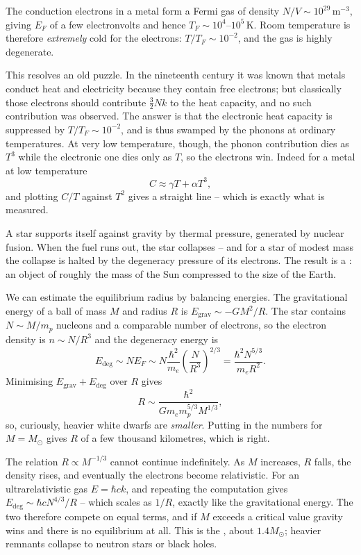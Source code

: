 \begin{example}
	The conduction electrons in a metal form a Fermi gas of density $N/V \sim 10^{29}\,\mathrm{m}^{-3}$, giving $E_F$ of a few electronvolts and hence $T_F \sim 10^4$--$10^5\,\mathrm{K}$. Room temperature is therefore \emph{extremely} cold for the electrons: $T/T_F \sim 10^{-2}$, and the gas is highly degenerate.

	This resolves an old puzzle. In the nineteenth century it was known that metals conduct heat and electricity because they contain free electrons; but classically those electrons should contribute $\tfrac 32 Nk$ to the heat capacity, and no such contribution was observed. The answer is that the electronic heat capacity is suppressed by $T/T_F \sim 10^{-2}$, and is thus swamped by the phonons at ordinary temperatures. At very low temperature, though, the phonon contribution dies as $T^3$ while the electronic one dies only as $T$, so the electrons win. Indeed for a metal at low temperature
	$$
	C \approx \gamma T + \alpha T^3,
	$$
	and plotting $C/T$ against $T^2$ gives a straight line -- which is exactly what is measured.
\end{example}

\begin{example}
	A star supports itself against gravity by thermal pressure, generated by nuclear fusion. When the fuel runs out, the star collapses -- and for a star of modest mass the collapse is halted by the degeneracy pressure of its electrons. The result is a : an object of roughly the mass of the Sun compressed to the size of the Earth.

	We can estimate the equilibrium radius by balancing energies. The gravitational energy of a ball of mass $M$ and radius $R$ is $E_{\mathrm{grav}} \sim -GM^2/R$. The star contains $N \sim M/m_p$ nucleons and a comparable number of electrons, so the electron density is $n \sim N/R^3$ and the degeneracy energy is
	$$
	E_{\mathrm{deg}} \sim N E_F \sim N \frac{\hbar^2}{m_e}\left(\frac{N}{R^3}\right)^{2/3} = \frac{\hbar^2 N^{5/3}}{m_e R^2}.
	$$
	Minimising $E_{\mathrm{grav}} + E_{\mathrm{deg}}$ over $R$ gives
	$$
	R \sim \frac{\hbar^2}{G m_e m_p^{5/3} M^{1/3}},
	$$
	so, curiously, heavier white dwarfs are \emph{smaller}. Putting in the numbers for $M = M_\odot$ gives $R$ of a few thousand kilometres, which is right.

	The relation $R \propto M^{-1/3}$ cannot continue indefinitely. As $M$ increases, $R$ falls, the density rises, and eventually the electrons become relativistic. For an ultrarelativistic gas $E = \hbar c k$, and repeating the computation gives $E_{\mathrm{deg}} \sim \hbar c N^{4/3}/R$ -- which scales as $1/R$, exactly like the gravitational energy. The two therefore compete on equal terms, and if $M$ exceeds a critical value gravity wins and there is no equilibrium at all. This is the , about $1.4 M_\odot$; heavier remnants collapse to neutron stars or black holes.
\end{example}

